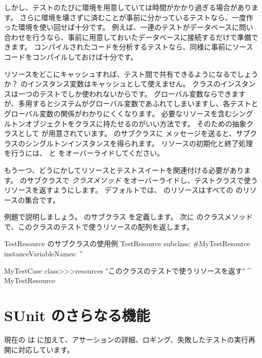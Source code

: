 \documentclass[a4paper,10pt,twoside]{book}
\begin{document}
しかし、テストのたびに環境を用意していては時間がかかり過ぎる場合があります。
さらに環境を壊さずに済むことが事前に分かっているテストなら、一度作った環境を使い回せば十分です。
例えば、一連のテストがデータベースに問い合わせを行うなら、事前に用意しておいたデータベースに接続するだけで準備できます。
コンパイルされたコードを分析するテストなら、同様に事前にソースコードをコンパイルしておけば十分です。

リソースをどこにキャッシュすれば、テスト間で共有できるようになるでしょうか？
 のインスタンス変数はキャッシュとして使えません。
 クラスのインスタンスは一つのテストでしか使われないからです。
グローバル変数ならできますが、多用するとシステムがグローバル変数であふれてしまいますし、各テストとグローバル変数の関係がわかりにくくなります。
必要なリソースを含むシングルトンオブジェクトをクラスに持たせるのがいい方法です。
そのための抽象クラスとして  が用意されています。
 のサブクラスに  メッセージを送ると、サブクラスのシングルトンインスタンスを得られます。
リソースの初期化と終了処理を行うには、  と  をオーバーライドしてください。

もう一つ、どうにかしてリソースとテストスイートを関連付ける必要があります。
 のサブクラスで  \emph{クラスメソッド} をオーバーライドし、テストクラスで使うリソースを返すようにします。
\ab{}
デフォルトでは、  のリソースはすべての  のリソースの集合です。

例題で説明しましょう。
 のサブクラス  を定義します。
次に  のクラスメソッド  で、このクラスのテストで使うリソースの配列を返します。


\begin{classdef}[mytestresource]{TestResource のサブクラスの使用例}
TestResource subclass: #MyTestResource
	instanceVariableNames: ''

MyTestCase class>>>resources
	"このクラスのテストで使うリソースを返す"
	^{ MyTestResource }
\end{classdef}

\section{SUnit のさらなる機能}

現在の \sunit は  に加えて、アサーションの詳細、ロギング、失敗したテストの実行再開に対応しています。
\end{document}
